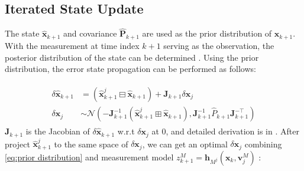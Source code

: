 \subsection{Iterated State Update}
\label{subsec:Iterated State Update}
The state $\widehat{\textbf{x}}_{k+1}$ and covariance $\widehat{\textbf{P}}_{k+1}$ are used as the prior distribution of $\textbf{x}_{k+1}$. With the measurement at time index $k+1$ serving as the observation, the posterior distribution of the state can be determined \cite{he2021kalman}. Using the prior distribution, the error state propagation can be performed as follows:

\vspace{-3mm}\small
\begin{eqnarray}
\begin{aligned}
  \label{eq:prior distribution}
    \delta\widehat{\textbf{x}}_{k+1}
    &=(\widehat{\textbf{x}}_{k+1}^j\boxminus\widehat{\textbf{x}}_{k+1})+\textbf{J}_{k+1}\delta\textbf{x}_j \\
    \delta\textbf{x}_j&\sim\mathcal{N}(-{\textbf{J}_{k+1}^{-1}}(\widehat{\textbf{x}}_{k+1}^j\boxplus\widehat{\textbf{x}}_{k+1}),{\textbf{J}_{k+1}^{-1}}\widehat{P}_{k+1}{\textbf{J}_{k+1}^{-\top}})
\end{aligned}
\end{eqnarray}
\normalsize
$\textbf{J}_{k+1}$ is the Jacobian of $\delta\widehat{\textbf{x}}_{k+1}$ w.r.t $\delta\textbf{x}_j$ at 0, and detailed derivation is in \cite{shi2023invariant}. After project $\widehat{\textbf{x}}_{k+1}^j$ to the same space of $\delta\textbf{x}_j$, we can get an optimal $\delta\textbf{x}_j$ combining \eqref{eq:prior distribution} and measurement model  $z_{k+1}^M = \textbf{h}_{M^j}(\textbf{x}_k,\textbf{v}_j^M)$ :

